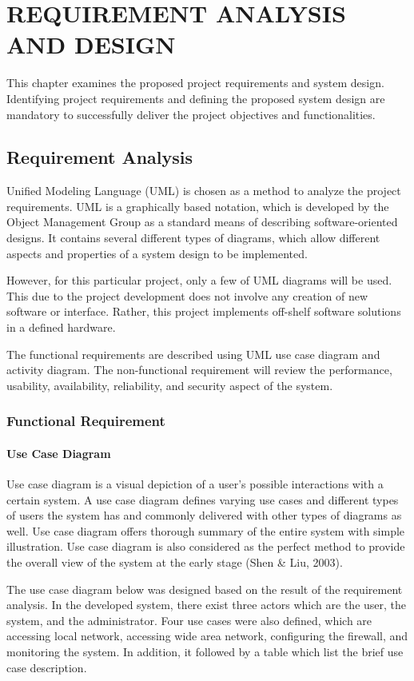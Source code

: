 \documentclass[../index.tex]{subfiles}
\begin{document}
\chapter{REQUIREMENT ANALYSIS AND DESIGN}

This chapter examines the proposed project requirements and system design. Identifying project
requirements and defining the proposed system design are mandatory to successfully deliver the
project objectives and functionalities.

\section{Requirement Analysis}

Unified Modeling Language (UML) is chosen as a method to analyze the project requirements. UML is
a graphically based notation, which is developed by the Object Management Group as a standard means
of describing software-oriented designs. It contains several different types of diagrams, which
allow different aspects and properties of a system design to be implemented.

However, for this particular project, only a few of UML diagrams will be used. This due to the
project development does not involve any creation of new software or interface. Rather, this project
implements off-shelf software solutions in a defined hardware.

The functional requirements are described using UML use case diagram and activity diagram. The
non-functional requirement will review the performance, usability, availability, reliability, and
security aspect of the system.

\subsection{Functional Requirement}

\subsubsection{Use Case Diagram}

Use case diagram is a visual depiction of a user's possible interactions with a certain system.
A use case diagram defines varying use cases and different types of users the system has and
commonly delivered with other types of diagrams as well. Use case diagram offers thorough summary of
the entire system with simple illustration. Use case diagram is also considered as the perfect
method to provide the overall view of the system at the early stage (Shen & Liu, 2003).

The use case diagram below was designed based on the result of the requirement analysis. In the
developed system, there exist three actors which are the user, the system, and the administrator.
Four use cases were also defined, which are accessing local network, accessing wide area network,
configuring the firewall, and monitoring the system. In addition, it followed by a table which list
the brief use case description.
\end{document}
